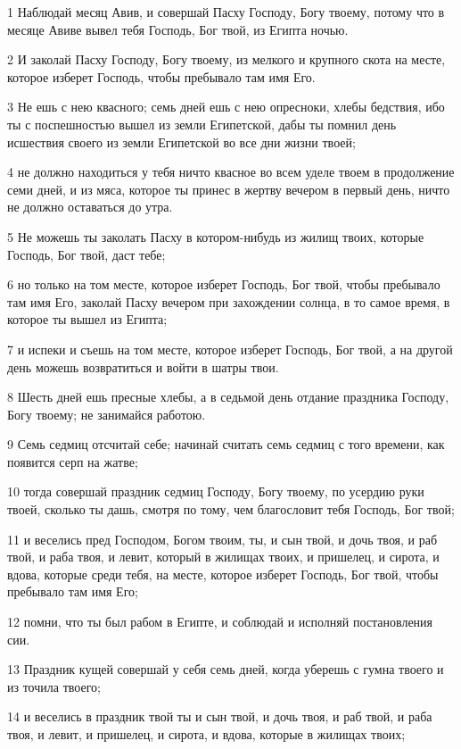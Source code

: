 \par 1 Наблюдай месяц Авив, и совершай Пасху Господу, Богу твоему, потому что в месяце Авиве вывел тебя Господь, Бог твой, из Египта ночью.
\par 2 И заколай Пасху Господу, Богу твоему, из мелкого и крупного скота на месте, которое изберет Господь, чтобы пребывало там имя Его.
\par 3 Не ешь с нею квасного; семь дней ешь с нею опресноки, хлебы бедствия, ибо ты с поспешностью вышел из земли Египетской, дабы ты помнил день исшествия своего из земли Египетской во все дни жизни твоей;
\par 4 не должно находиться у тебя ничто квасное во всем уделе твоем в продолжение семи дней, и из мяса, которое ты принес в жертву вечером в первый день, ничто не должно оставаться до утра.
\par 5 Не можешь ты заколать Пасху в котором-нибудь из жилищ твоих, которые Господь, Бог твой, даст тебе;
\par 6 но только на том месте, которое изберет Господь, Бог твой, чтобы пребывало там имя Его, заколай Пасху вечером при захождении солнца, в то самое время, в которое ты вышел из Египта;
\par 7 и испеки и съешь на том месте, которое изберет Господь, Бог твой, а на другой день можешь возвратиться и войти в шатры твои.
\par 8 Шесть дней ешь пресные хлебы, а в седьмой день отдание праздника Господу, Богу твоему; не занимайся работою.
\par 9 Семь седмиц отсчитай себе; начинай считать семь седмиц с того времени, как появится серп на жатве;
\par 10 тогда совершай праздник седмиц Господу, Богу твоему, по усердию руки твоей, сколько ты дашь, смотря по тому, чем благословит тебя Господь, Бог твой;
\par 11 и веселись пред Господом, Богом твоим, ты, и сын твой, и дочь твоя, и раб твой, и раба твоя, и левит, который в жилищах твоих, и пришелец, и сирота, и вдова, которые среди тебя, на месте, которое изберет Господь, Бог твой, чтобы пребывало там имя Его;
\par 12 помни, что ты был рабом в Египте, и соблюдай и исполняй постановления сии.
\par 13 Праздник кущей совершай у себя семь дней, когда уберешь с гумна твоего и из точила твоего;
\par 14 и веселись в праздник твой ты и сын твой, и дочь твоя, и раб твой, и раба твоя, и левит, и пришелец, и сирота, и вдова, которые в жилищах твоих;
